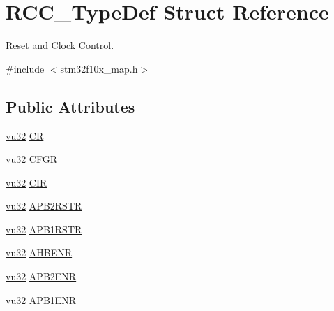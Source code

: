 \hypertarget{struct_r_c_c___type_def}{}\section{R\+C\+C\+\_\+\+Type\+Def Struct Reference}
\label{struct_r_c_c___type_def}


Reset and Clock Control.  




{\ttfamily \#include $<$stm32f10x\+\_\+map.\+h$>$}

\subsection*{Public Attributes}
\begin{DoxyCompactItemize}
\item 
\hyperlink{agilefox_2library_2inc_2stm32f10x__type_8h_a6e2761f0a1011f84ed96b946f2c8a563}{vu32} \hyperlink{struct_r_c_c___type_def_a911ae74fe86ceb95e4a7c870de730c05}{CR}
\item 
\hyperlink{agilefox_2library_2inc_2stm32f10x__type_8h_a6e2761f0a1011f84ed96b946f2c8a563}{vu32} \hyperlink{struct_r_c_c___type_def_a6bcdfb16e7c68a1625e84a179d7cf346}{C\+F\+GR}
\item 
\hyperlink{agilefox_2library_2inc_2stm32f10x__type_8h_a6e2761f0a1011f84ed96b946f2c8a563}{vu32} \hyperlink{struct_r_c_c___type_def_a0d7fa9f27da52f637063518bd9732fca}{C\+IR}
\item 
\hyperlink{agilefox_2library_2inc_2stm32f10x__type_8h_a6e2761f0a1011f84ed96b946f2c8a563}{vu32} \hyperlink{struct_r_c_c___type_def_a7f6cee7f43c0c67e5fccef387f9d530c}{A\+P\+B2\+R\+S\+TR}
\item 
\hyperlink{agilefox_2library_2inc_2stm32f10x__type_8h_a6e2761f0a1011f84ed96b946f2c8a563}{vu32} \hyperlink{struct_r_c_c___type_def_afc9fdc77b261acf0bd8087f35dbb9c60}{A\+P\+B1\+R\+S\+TR}
\item 
\hyperlink{agilefox_2library_2inc_2stm32f10x__type_8h_a6e2761f0a1011f84ed96b946f2c8a563}{vu32} \hyperlink{struct_r_c_c___type_def_a876b290043b4280f12e5d8cffbfeb646}{A\+H\+B\+E\+NR}
\item 
\hyperlink{agilefox_2library_2inc_2stm32f10x__type_8h_a6e2761f0a1011f84ed96b946f2c8a563}{vu32} \hyperlink{struct_r_c_c___type_def_ad46d55093702bf1e044963518b86a663}{A\+P\+B2\+E\+NR}
\item 
\hyperlink{agilefox_2library_2inc_2stm32f10x__type_8h_a6e2761f0a1011f84ed96b946f2c8a563}{vu32} \hyperlink{struct_r_c_c___type_def_aac119612ff0201cea60c03180be197d7}{A\+P\+B1\+E\+NR}

\end{DoxyCompactItemize}
